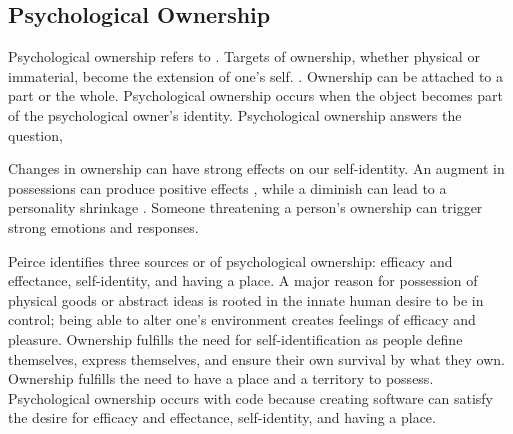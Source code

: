 \subsection{Psychological Ownership}
Psychological ownership refers to  \cite{Pierce2001}. Targets of ownership, whether physical or immaterial, become the extension of one's self.  \cite{Isaacs1933}. Ownership can be attached to a part or the whole. Psychological ownership occurs when the object becomes part of the psychological owner's identity. Psychological ownership answers the question, 

Changes in ownership can have strong effects on our self-identity. An augment in possessions can produce positive effects \cite{Formanek1994}, while a diminish can lead to a personality shrinkage \cite{James1890}. Someone threatening a person's ownership can trigger strong emotions and responses.

Peirce \cite{Pierce2001} identifies three sources or  of psychological ownership: efficacy and effectance, self-identity, and having a place. A major reason for possession of physical goods or abstract ideas is rooted in the innate human desire to be in control; being able to alter one's environment creates feelings of efficacy and pleasure. Ownership fulfills the need for self-identification as people define themselves, express themselves, and ensure their own survival by what they own. Ownership fulfills the need to have a place and a territory to possess.  Psychological ownership occurs with code because creating software can satisfy the desire for efficacy and effectance, self-identity, and having a place.

